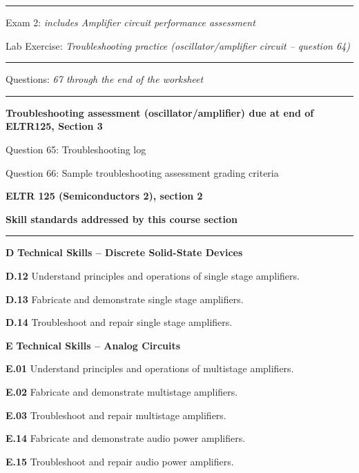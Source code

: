 \vskip 10pt
\hrule \vskip 5pt
\noindent
{}

\hskip 10pt Exam 2: {\it includes Amplifier circuit performance assessment}
 
\hskip 10pt Lab Exercise: {\it Troubleshooting practice (oscillator/amplifier circuit -- question 64)}
  
\vskip 10pt
\hrule \vskip 5pt
\noindent
{}

\hskip 10pt Questions: {\it 67 through the end of the worksheet}
 
\vskip 10pt

\hrule \vskip 5pt
\noindent
{}

\hskip 10pt {\bf Troubleshooting assessment (oscillator/amplifier) due at end of ELTR125, Section 3}

\hskip 10pt Question 65: Troubleshooting log
 
\hskip 10pt Question 66: Sample troubleshooting assessment grading criteria
 
\vskip 10pt










\vfil \eject

\centerline{\bf ELTR 125 (Semiconductors 2), section 2} \bigskip 
 
\vskip 10pt

\noindent
{\bf Skill standards addressed by this course section}

\vskip 5pt

\hrule \vskip 10pt
\noindent
{}

\vskip 5pt

\medskip
\item{\bf D} {\bf Technical Skills -- Discrete Solid-State Devices}
\item{\bf D.12} Understand principles and operations of single stage amplifiers.
\item{\bf D.13} Fabricate and demonstrate single stage amplifiers.
\item{\bf D.14} Troubleshoot and repair single stage amplifiers.
\item{\bf E} {\bf Technical Skills -- Analog Circuits}
\item{\bf E.01} Understand principles and operations of multistage amplifiers.
\item{\bf E.02} Fabricate and demonstrate multistage amplifiers.
\item{\bf E.03} Troubleshoot and repair multistage amplifiers.
\item{\bf E.14} Fabricate and demonstrate audio power amplifiers.
\item{\bf E.15} Troubleshoot and repair audio power amplifiers.
\medskip

